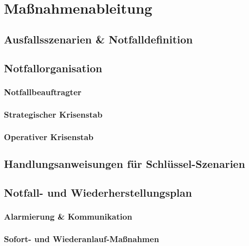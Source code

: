 \section{Maßnahmenableitung}
\subsection{Ausfallsszenarien \& Notfalldefinition}
\subsection{Notfallorganisation}
  \subsubsection{Notfallbeauftragter}
  \subsubsection{Strategischer Krisenstab}
  \subsubsection{Operativer Krisenstab}
\subsection{Handlungsanweisungen für Schlüssel-Szenarien}
\subsection{Notfall- und Wiederherstellungsplan}
  \subsubsection{Alarmierung \& Kommunikation}
  \subsubsection{Sofort- und Wiederanlauf-Maßnahmen}